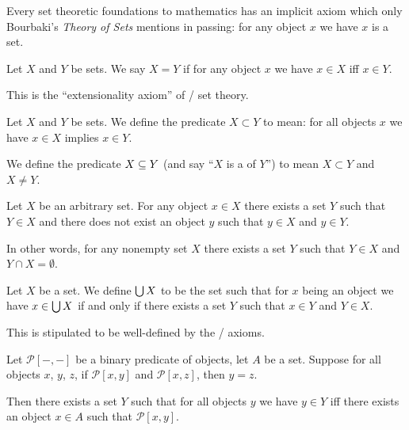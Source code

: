 \begin{remark}
Every set theoretic foundations to mathematics has an implicit axiom
which only Bourbaki's \emph{Theory of Sets} mentions in passing: for
any object $x$ we have $x$ is a set.
\end{remark}

\begin{axiom}\label{defn:set-theory:extensionality}
Let $X$ and $Y$ be sets. We say $X = Y$ if for any object $x$ we have
$x\in X$ iff $x\in Y$.

This is the ``extensionality axiom'' of \ZF/ set theory.
\end{axiom}

\begin{definition}
Let $X$ and $Y$ be sets. We define the predicate $X\subset Y$ to mean:
for all objects $x$ we have $x\in X$ implies $x\in Y$.

We define the predicate $X\propersubset Y$ (and say ``$X$ is a
 of $Y$'') to mean $X\subset Y$ and $X\neq Y$.
\end{definition}

\begin{axiom}[Regularity]
Let $X$ be an arbitrary set. For any object $x\in X$ there exists a
set $Y$ such that $Y\in X$ and there does not exist an object $y$ such
that $y\in X$ and $y\in Y$.

In other words, for any nonempty set $X$ there exists a set $Y$ such
that $Y\in X$ and $Y\cap X=\emptyset$.
\end{axiom}

\begin{axiom}
Let $X$ be a set. We define $\bigcup X$ to be the set such that for $x$
being an object we have $x\in\bigcup X$ if and only if there exists a
set $Y$ such that $x\in Y$ and $Y\in X$.

This is stipulated to be well-defined by the \ZF/ axioms.
\end{axiom}

\begin{axiom-scheme}[Replacement]
Let $\mathcal{P}[-,-]$ be a binary predicate of objects, let $A$ be a set.
Suppose for all objects $x$, $y$, $z$, if $\mathcal{P}[x,y]$ and
$\mathcal{P}[x,z]$, then $y = z$.

Then there exists a set $Y$ such that for all objects $y$ we have
$y\in Y$ iff there exists an object $x\in A$ such that $\mathcal{P}[x,y]$.
\end{axiom-scheme}


